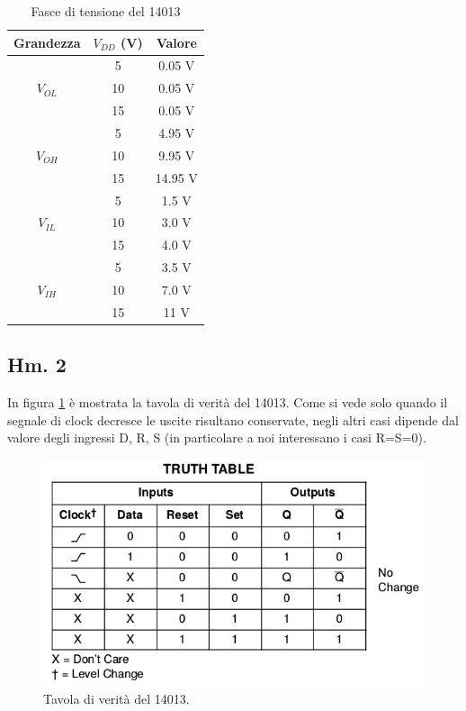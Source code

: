\documentclass[journal, a4paper]{IEEEtran}
\begin{document}
\begin{table}[htp]
\centering
\caption{Fasce di tensione del 14013}
\label{tab:data}
\begin{tabular}{|c|c|c|}
  \hline
  Grandezza & $V_{DD}$ (V)& Valore \\
  \hline
           &  5  &  0.05 V \\ \cline{2-3}
  $V_{OL}$ & 10  &  0.05 V \\ \cline{2-3}
           & 15  &  0.05 V \\ 
  \hline 
           &  5  &  4.95 V \\ \cline{2-3}
  $V_{OH}$ & 10  &  9.95 V \\ \cline{2-3}
           & 15  & 14.95 V \\ 
  \hline \hline
           &  5  &  1.5 V \\ \cline{2-3}
  $V_{IL}$ & 10  &  3.0 V \\ \cline{2-3}
           & 15  &  4.0 V \\ 
  \hline 
           &  5  &  3.5 V \\ \cline{2-3}
  $V_{IH}$ & 10  &  7.0 V \\ \cline{2-3}
           & 15  &   11 V \\ 
  \hline
\end{tabular}
\end{table}

\subsection{Hm. 2}

In figura \ref{fig:truth} è mostrata la tavola di verità del 14013. Come si vede solo quando il segnale di clock decresce le uscite risultano conservate, negli altri casi dipende dal valore degli ingressi D, R, S (in particolare a noi interessano i casi R=S=0).

\begin{figure}[htp]
\centering
\includegraphics[scale=.4]{truth}
\caption{Tavola di verità del 14013.}
\label{fig:truth}
\end{figure}
\end{document}

